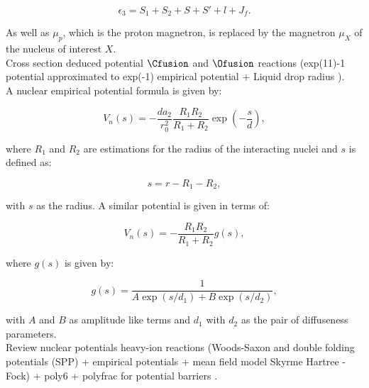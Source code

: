 \documentclass[openany]{book}
\begin{document}
\begin{equation}\label{eq:potential_calculations_radiativeCapture_magneticM_reduced_S2_exponential}
	\epsilon_3 = S_1 + S_2 + S + S' + l + J_f.
\end{equation}

As well as $\mu_p$, which is the proton magnetron, is replaced by the magnetron $\mu_X$ of the nucleus of interest $X$. \\

Cross section deduced potential  $\Cfusion$ and $\Ofusion$ reactions (exp(11)-1 potential approximated to exp(-1) empirical potential + Liquid drop radius )\cite{bass_1977}. \\

A nuclear empirical potential formula is given by: 

\begin{equation}\label{potential_empirical_exp1}
	V_n(s) = - \frac{da_2}{r^2_0} \frac{R_1R_2}{R_1 + R_2} 	\exp \left( - \frac{s}{d}\right),
\end{equation}

where $R_1$ and $R_2$ are estimations for the radius of the interacting nuclei and $s$ is defined as: 

\begin{equation}\label{potential_empirical_exp1_s}
	s = r - R_1 - R_2,
\end{equation}

with $s$ as the radius. A similar potential is given in terms of: 

\begin{equation}\label{potential_empirical_exp11}
	V_n(s) = - \frac{R_1R_2}{R_1 + R_2} g(s),
\end{equation}

where $g(s)$ is given by:

\begin{equation}\label{potential_empirical_exp11_g}
	g(s) = \frac{1}{A\exp (s/d_1) + B\exp(s/d_2)},
\end{equation}

with $A$ and $B$ as amplitude like terms and $d_1$ with $d_2$ as the pair of diffuseness parameters. \\

Review nuclear potentials heavy-ion reactions (Woods-Saxon and double folding potentials (SPP) + empirical potentials  + mean field model Skyrme Hartree - Fock) + poly6 + polyfrac for potential barriers \cite{nandi_swami_gupta_kumar_chakraborty_manjunatha_2022}. \\
\end{document}
